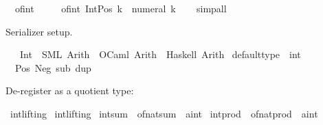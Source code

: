 \begin{isabellebody}
\ \ {\isachardoublequoteopen}of{\isacharunderscore}{\kern0pt}int\ {}\ {\isacharequal}{\kern0pt}\ {}{\isachardoublequoteclose}\isanewline
\ \ {\isachardoublequoteopen}of{\isacharunderscore}{\kern0pt}int\ {\isacharparenleft}{\kern0pt}Int{\isachardot}{\kern0pt}Pos\ k{\isacharparenright}{\kern0pt}\ {\isacharequal}{\kern0pt}\ numeral\ k{\isachardoublequoteclose}\isanewline
%
\isadelimproof
\ \ %
\endisadelimproof
%
\isatagproof
{}\isamarkupfalse%
\ simp{\isacharunderscore}{\kern0pt}all%
\endisatagproof
{\isafoldproof}%
%
\isadelimproof
%
\endisadelimproof
%
\begin{isamarkuptext}%
Serializer setup.%
\end{isamarkuptext}\isamarkuptrue%
\isamarkupfalse%
\isanewline
\ \ \ Int\ {\isasymrightharpoonup}\ {\isacharparenleft}{\kern0pt}SML{\isacharparenright}{\kern0pt}\ Arith\ \ {\isacharparenleft}{\kern0pt}OCaml{\isacharparenright}{\kern0pt}\ Arith\ \ {\isacharparenleft}{\kern0pt}Haskell{\isacharparenright}{\kern0pt}\ Arith\isanewline
\isanewline
{}\isamarkupfalse%
\ {\isacharbrackleft}{\kern0pt}default{\isacharunderscore}{\kern0pt}type\ {\isacharequal}{\kern0pt}\ int{\isacharbrackright}{\kern0pt}\isanewline
\isanewline
{}\isamarkupfalse%
\ {\isacharparenleft}{\kern0pt}\ Pos\ Neg\ sub\ dup%
\begin{isamarkuptext}%
De-register  as a quotient type:%
\end{isamarkuptext}\isamarkuptrue%
\isamarkupfalse%
\ int{\isachardot}{\kern0pt}lifting\isanewline
{}\isamarkupfalse%
\ int{\isachardot}{\kern0pt}lifting%
\isadelimdocument
%
\endisadelimdocument
%
\isatagdocument
%
\isamarkuptrue%
%
\endisatagdocument
{\isafolddocument}%
%
\isadelimdocument
%
\endisadelimdocument
{}\isamarkupfalse%
\ int{\isacharunderscore}{\kern0pt}sum\ {\isacharequal}{\kern0pt}\ of{\isacharunderscore}{\kern0pt}nat{\isacharunderscore}{\kern0pt}sum\ {\isacharbrackleft}{\kern0pt}\ {\isacharprime}{\kern0pt}a{\isacharequal}{\kern0pt}int{\isacharbrackright}{\kern0pt}\isanewline
{}\isamarkupfalse%
\ int{\isacharunderscore}{\kern0pt}prod\ {\isacharequal}{\kern0pt}\ of{\isacharunderscore}{\kern0pt}nat{\isacharunderscore}{\kern0pt}prod\ {\isacharbrackleft}{\kern0pt}\ {\isacharprime}{\kern0pt}a{\isacharequal}{\kern0pt}int{\isacharbrackright}{\kern0pt}\isanewline

\end{isabellebody}
